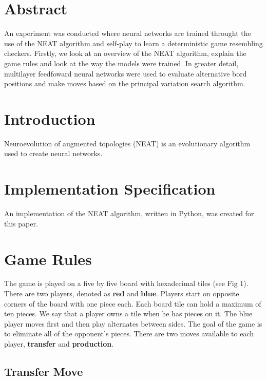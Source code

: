 \documentclass[12pt]{article}
\begin{document}
\section*{Abstract}

An experiment was conducted where neural networks are trained throught the use of the
NEAT algorithm and self-play to learn a deterministic game resembling checkers. Firstly,
we look at an overview of the NEAT algorithm, explain the game rules and look at the 
way the models were trained. In greater detail, multilayer feedfoward neural networks 
were used to evaluate alternative bord positions and make moves based on the principal
variation search algorithm.

\section*{Introduction}

Neuroevolution of augmented topologies (NEAT) is an evolutionary algorithm used to create
neural networks.

\section*{Implementation Specification}

An implementation of the NEAT algorithm, written in Python, was created for this paper.

\section*{Game Rules}

The game is played on a five by five board with hexadecimal tiles (see Fig 1). There are
two players, denoted as \textbf{red} and \textbf{blue}. Players start on opposite
corners of the board with one piece each. Each board tile can hold a maximum of ten
pieces. We say that a player owns a tile when he has pieces on it. The blue player moves
first and then play alternates between sides. The goal of the game is to eliminate all
of the opponent's pieces. There are two moves available to each player, \textbf{transfer}
and \textbf{production}.

\subsection*{Transfer Move}
\end{document}
